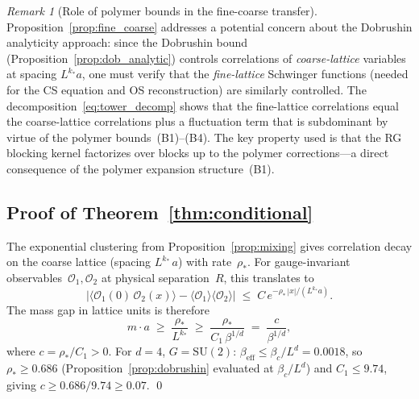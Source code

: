 \documentclass[11pt,a4paper]{article}
\theoremstyle{plain}
\theoremstyle{definition}
\theoremstyle{remark}
\newtheorem{remark}[theorem]{Remark}
\newcommand{\SU}{\mathrm{SU}}
\begin{document}
\begin{remark}[Role of polymer bounds in the
fine-coarse transfer]
\label{rem:fine_coarse}
Proposition~\ref{prop:fine_coarse} addresses a
potential concern about the Dobrushin analyticity
approach: since the Dobrushin bound
(Proposition~\ref{prop:dob_analytic}) controls
correlations of \emph{coarse-lattice} variables at
spacing $L^{k_*}a$, one must verify that the
\emph{fine-lattice} Schwinger functions (needed for
the CS equation and OS reconstruction) are similarly
controlled.  The decomposition~\eqref{eq:tower_decomp}
shows that the fine-lattice correlations equal the
coarse-lattice correlations plus a fluctuation term that
is subdominant by virtue of the polymer
bounds~(B1)--(B4).  The key property used is that the RG blocking
kernel factorizes over blocks up to the polymer
corrections---a direct consequence of the polymer
expansion structure~(B1).
\end{remark}

\subsection{Proof of Theorem~\ref{thm:conditional}}

The exponential clustering from Proposition~\ref{prop:mixing}
gives correlation decay on the coarse lattice (spacing
$L^{k_*}\,a$) with rate~$\rho_*$.  For gauge-invariant
observables~$\mathcal{O}_1, \mathcal{O}_2$ at physical
separation~$R$, this translates to
\begin{equation}
  |\langle \mathcal{O}_1(0)\,\mathcal{O}_2(x)\rangle
  - \langle \mathcal{O}_1\rangle\langle\mathcal{O}_2\rangle|
  \;\leq\; C\,e^{-\rho_*\,|x| / (L^{k_*} a)}.
\end{equation}
The mass gap in lattice units is therefore
\begin{equation}
  m \cdot a \;\geq\;
  \frac{\rho_*}{L^{k_*}}
  \;\geq\; \frac{\rho_*}{C_1\,\beta^{1/d}}
  \;=\; \frac{c}{\beta^{1/d}},
\end{equation}
where $c = \rho_* / C_1 > 0$.
For $d = 4$, $G = \SU(2)$:
$\beta_{\mathrm{eff}} \leq \beta_c/L^d = 0.0018$, so
$\rho_* \geq 0.686$
(Proposition~\ref{prop:dobrushin} evaluated at
$\beta_c/L^d$) and $C_1 \leq 9.74$, giving
$c \geq 0.686/9.74 \geq 0.07$. \qed
\end{document}
